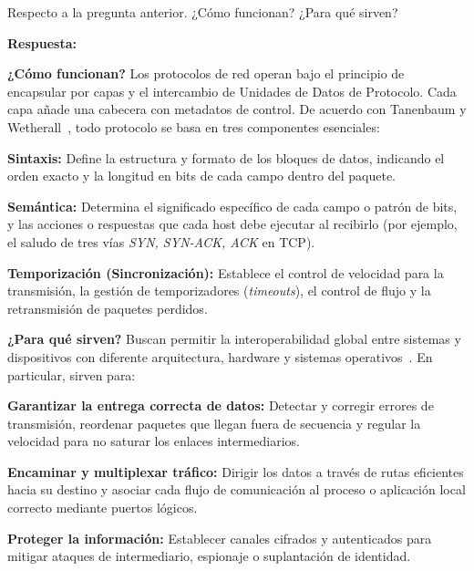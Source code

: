 Respecto a la pregunta anterior. ¿Cómo funcionan? ¿Para qué sirven?

\textbf{Respuesta:}

\textbf{¿Cómo funcionan?}
Los protocolos de red operan bajo el principio de encapsular por capas y el intercambio de Unidades de Datos de Protocolo. Cada capa añade una cabecera con metadatos de control. De acuerdo con Tanenbaum y Wetherall~\cite{tanenbaum_redes}, todo protocolo se basa en tres componentes esenciales:
\begin{enumerateColor}
    \item \textbf{Sintaxis:} Define la estructura y formato de los bloques de datos, indicando el orden exacto y la longitud en bits de cada campo dentro del paquete.
    \item \textbf{Semántica:} Determina el significado específico de cada campo o patrón de bits, y las acciones o respuestas que cada host debe ejecutar al recibirlo (por ejemplo, el saludo de tres vías \textit{SYN, SYN-ACK, ACK} en TCP).
    \item \textbf{Temporización (Sincronización):} Establece el control de velocidad para la transmisión, la gestión de temporizadores (\textit{timeouts}), el control de flujo y la retransmisión de paquetes perdidos.
\end{enumerateColor}

\textbf{¿Para qué sirven?}
Buscan permitir la interoperabilidad global entre sistemas y dispositivos con diferente arquitectura, hardware y sistemas operativos~\cite{rfc1122_comm_layers}. En particular, sirven para:
\begin{itemizeColor}
    \item \textbf{Garantizar la entrega correcta de datos:} Detectar y corregir errores de transmisión, reordenar paquetes que llegan fuera de secuencia y regular la velocidad para no saturar los enlaces intermediarios.
    \item \textbf{Encaminar y multiplexar tráfico:} Dirigir los datos a través de rutas eficientes hacia su destino y asociar cada flujo de comunicación al proceso o aplicación local correcto mediante puertos lógicos.
    \item \textbf{Proteger la información:} Establecer canales cifrados y autenticados para mitigar ataques de intermediario, espionaje o suplantación de identidad.
\end{itemizeColor}

